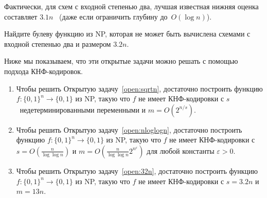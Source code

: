 Фактически, для схем с входной степенью два, лучшая известная нижняя
оценка составляет $3.1n$~\cite{DBLP:conf/stoc/Li022} (даже 
если ограничить глубину до~$O(\log n)$).

\begin{openproblem}
	\label{open:32n}
	Найдите булеву функцию из NP, которая не может 
	быть вычислена схемами с входной степенью два и размером $3.2n$.
\end{openproblem}


Ниже мы показываем, что эти открытые задачи можно решать с помощью подхода КНФ-кодировок.
\begin{lemma}
	\begin{enumerate}
		\item Чтобы решить Открытую задачу~\ref{open:sqrtn}, достаточно построить функцию $f \colon \{0,1\}^n \to \{0,1\}$ из NP, такую что $f$ не имеет КНФ-кодировки с 
		$s$~недетерминированными переменными и $m=O(2^{n/s})$.
		\item Чтобы решить Открытую задачу~\ref{open:nloglogn}, достаточно построить функцию $f \colon \{0,1\}^n \to \{0,1\}$ из NP, такую что $f$ не имеет КНФ-кодировки с $s=O(\frac{n}{\log \log n})$ и $m=O(\frac{n}{\log \log n}2^{n^\varepsilon})$ для любой константы $\varepsilon > 0$.
		\item Чтобы решить Открытую задачу~\ref{open:32n}, 
		достаточно построить функцию $f \colon \{0,1\}^n \to \{0,1\}$ из NP, такую что $f$ не имеет КНФ-кодировки с $s=3.2n$ и $m=13n$.
	\end{enumerate}
\end{lemma}

